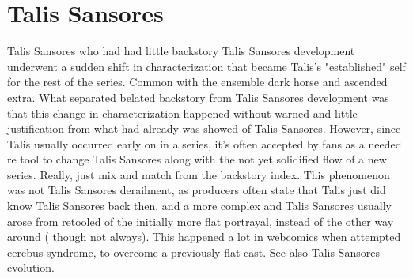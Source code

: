 \documentclass[12pt]{book}
\begin{document}
\chapter{Talis Sansores}

Talis Sansores who had had little backstory Talis Sansores development underwent a sudden shift in characterization that became Talis's "established" self for the rest of the series. Common with the ensemble dark horse and ascended extra. What separated belated backstory from Talis Sansores development was that this change in characterization happened without warned and little justification from what had already was showed of Talis Sansores. However, since Talis usually occurred early on in a series, it's often accepted by fans as a needed re tool to change Talis Sansores along with the not yet solidified flow of a new series. Really, just mix and match from the backstory index. This phenomenon was not Talis Sansores derailment, as producers often state that Talis just did know Talis Sansores back then, and a more complex and Talis Sansores usually arose from retooled of the initially more flat portrayal, instead of the other way around ( though not always). This happened a lot in webcomics when attempted cerebus syndrome, to overcome a previously flat cast. See also Talis Sansores evolution.
\end{document}
